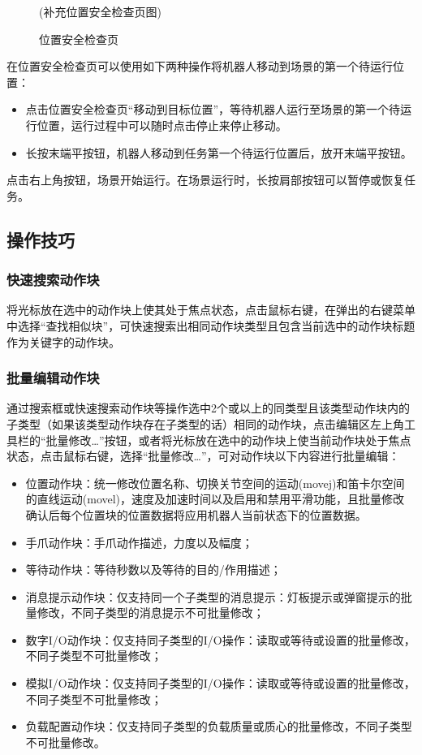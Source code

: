 \begin{figure}[ht]
	\centering
	\color{red}(补充位置安全检查页图)
	\caption{位置安全检查页}
	\label{fig:位置安全检查页}
\end{figure}

在位置安全检查页可以使用如下两种操作将机器人移动到场景的第一个待运行位置：
\begin{itemize}
	\item 点击位置安全检查页“移动到目标位置”，等待机器人运行至场景的第一个待运行位置，运行过程中可以随时点击停止来停止移动。
	\item 长按末端平按钮，机器人移动到任务第一个待运行位置后，放开末端平按钮。
\end{itemize}


点击右上角按钮，场景开始运行。在场景运行时，长按肩部按钮可以暂停或恢复任务。

\subsection{操作技巧}
\subsubsection{快速搜索动作块}
将光标放在选中的动作块上使其处于焦点状态，点击鼠标右键，在弹出的右键菜单中选择“查找相似块”，可快速搜索出相同动作块类型且包含当前选中的动作块标题作为关键字的动作块。
\subsubsection{批量编辑动作块}
通过搜索框或快速搜索动作块等操作选中2个或以上的同类型且该类型动作块内的子类型（如果该类型动作块存在子类型的话）相同的动作块，点击编辑区左上角工具栏的“批量修改…”按钮，或者将光标放在选中的动作块上使当前动作块处于焦点状态，点击鼠标右键，选择“批量修改…”，可对动作块以下内容进行批量编辑：
\begin{itemize}
\item 位置动作块：统一修改位置名称、切换关节空间的运动(movej)和笛卡尔空间的直线运动(movel)，速度及加速时间以及启用和禁用平滑功能，且批量修改确认后每个位置块的位置数据将应用机器人当前状态下的位置数据。
\item 手爪动作块：手爪动作描述，力度以及幅度；
\item 等待动作块：等待秒数以及等待的目的/作用描述；
\item 消息提示动作块：仅支持同一个子类型的消息提示：灯板提示或弹窗提示的批量修改，不同子类型的消息提示不可批量修改；
\item 数字I/O动作块：仅支持同子类型的I/O操作：读取或等待或设置的批量修改，不同子类型不可批量修改；
\item 模拟I/O动作块：仅支持同子类型的I/O操作：读取或等待或设置的批量修改，不同子类型不可批量修改；
\item 负载配置动作块：仅支持同子类型的负载质量或质心的批量修改，不同子类型不可批量修改。
\end{itemize}

